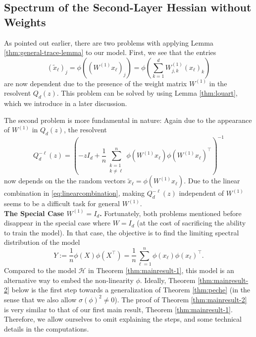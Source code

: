 \documentclass{article}
\begin{document}
\subsection{Spectrum of the Second-Layer Hessian without Weights}
As pointed out earlier, there are two problems with applying Lemma \ref{thm:general-trace-lemma} to our model. First, we see that the entries
\begin{equation}
(\tilde{x}_\ell)_j=\phi((W^{(1)}x_\ell)_j)=\phi\left(\sum_{k=1}^d W^{(1)}_{j,k}(x_\ell)_k\right)\label{eq:linearcombination}
\end{equation}
are now dependent due to the presence of the weight matrix $W^{(1)}$ in the resolvent $Q_d(z)$. This problem can be solved by using Lemma \ref{thm:louart}, which we introduce in a later discussion.
\par
The second problem is more fundamental in nature: Again due to the appearance of $W^{(1)}$ in $Q_d(z)$, the resolvent
\begin{equation}
Q_d^{-\ell}(z)=\left(-zI_d+\frac{1}{n}\sum_{\substack{k=1\\k\neq\ell}}^n\phi(W^{(1)}x_\ell)\phi(W^{(1)}x_\ell)^\top\right)^{-1}
\end{equation}
now depends on the the random vectors $\tilde{x}_\ell=\phi(W^{(1)}x_\ell)$. Due to the linear combination in \ref{eq:linearcombination}, making $Q_d^{-\ell}(z)$ independent of $W^{(1)}$ seems to be a difficult task for general $W^{(1)}$.
\bigskip
\bigskip
\\
\textbf{The Special Case $W^{(1)}=I_d$.} Fortunately, both problems mentioned before disappear in the special case where $W=I_d$ (at the cost of sacrificing the ability to train the model). In that case, the objective is to find the limiting spectral distribution of the model
\begin{equation}
Y:=\frac{1}{n}\phi(X)\phi(X^\top)=\frac{1}{n}\sum_{\ell=1}^n\phi(x_\ell)\phi(x_\ell)^\top.
\end{equation}
Compared to the model $\mathcal{H}$ in Theorem \ref{thm:mainresult-1}, this model is an alternative way to embed the non-linearity $\phi$. Ideally, Theorem \ref{thm:mainresult-2} below is the first step towards a generalization of Theorem \ref{thm:peche} (in the sense that we also allow $\sigma(\phi)^2\neq0$). The proof of Theorem \ref{thm:mainresult-2} is very similar to that of our first main result, Theorem \ref{thm:mainresult-1}. Therefore, we allow ourselves to omit explaining the steps, and some technical details in the computations.
\bigskip
\\
\end{document}
